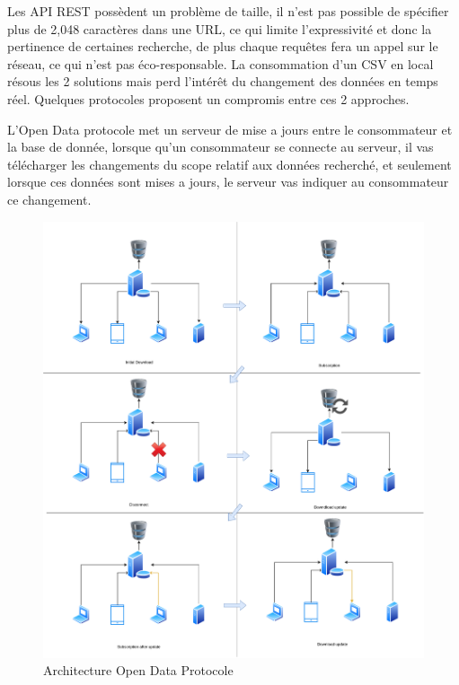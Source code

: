 Les API REST possèdent un problème de taille, il n'est pas possible de spécifier plus de
2,048 caractères dans une URL, ce qui limite l'expressivité et donc la pertinence de certaines recherche,
de plus chaque requêtes fera un appel sur le réseau, ce qui n'est pas éco-responsable.
La consommation d'un CSV en local résous les 2 solutions mais perd l'intérêt du changement des données en temps
réel.
Quelques protocoles proposent un compromis entre ces 2 approches.

L'Open Data protocole met un serveur de mise a jours entre le consommateur et la base de donnée,
lorsque qu'un consommateur se connecte au serveur, il vas télécharger les changements du scope relatif aux données
recherché, et seulement lorsque ces données sont mises a jours, le serveur vas indiquer au consommateur
ce changement.

\begin{figure}[h!]
  \centering
  \includegraphics[scale=0.19]{media/open_data_protocol.png}
  \caption{Architecture Open Data Protocole}
\end{figure}




